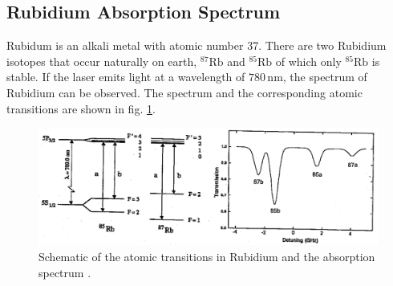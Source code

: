 \subsection*{Rubidium Absorption Spectrum}
Rubidum is an alkali metal with atomic number 37. There are two Rubidium isotopes that occur naturally on earth, 
${}^{87}\text{Rb}$ and ${}^{85}\text{Rb}$ of which only ${}^{85}\text{Rb}$ is stable.
If the laser emits light at a wavelength of $780 \, \text{nm}$, the spectrum of Rubidium can be observed. The spectrum
and the corresponding atomic transitions are shown in fig. \ref{fig:rubidium}.
\begin{figure}
    \centering
    \includegraphics[width = \linewidth]{Bilder/rubidium.png}
    \caption{Schematic of the atomic transitions in Rubidium and the absorption spectrum \cite{sample}.}
    \label{fig:rubidium}
\end{figure}